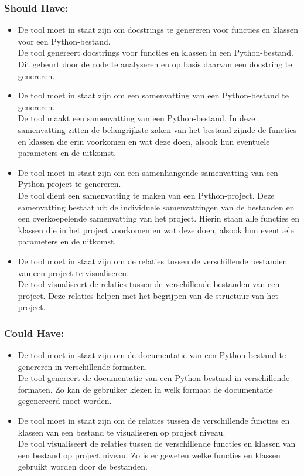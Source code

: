 \subsubsection{Should Have:}
\begin{itemize}
    \item De tool moet in staat zijn om docstrings te genereren voor functies en klassen voor een Python-bestand.\\
    De tool genereert docstrings voor functies en klassen in een Python-bestand. Dit gebeurt door de code te analyseren en op basis daarvan een docstring te genereren.
    \item De tool moet in staat zijn om een samenvatting van een Python-bestand te genereren.\\
    De tool maakt een samenvatting van een Python-bestand. In deze samenvatting zitten de belangrijkste zaken van het bestand zijnde de functies en klassen die erin voorkomen en wat deze doen, alsook hun eventuele parameters en de uitkomst.
    \item De tool moet in staat zijn om een samenhangende samenvatting van een Python-project te genereren.\\
    De tool dient een samenvatting te maken van een Python-project. Deze samenvatting bestaat uit de individuele samenvattingen van de bestanden en een overkoepelende samenvatting van het project.
    Hierin staan alle functies en klassen die in het project voorkomen en wat deze doen, alsook hun eventuele parameters en de uitkomst.
    \item De tool moet in staat zijn om de relaties tussen de verschillende bestanden van een project te visualiseren.\\
    De tool visualiseert de relaties tussen de verschillende bestanden van een project. Deze relaties helpen met het begrijpen van de structuur van het project.
\end{itemize}

\subsubsection{Could Have:}
\begin{itemize}
    \item De tool moet in staat zijn om de documentatie van een Python-bestand te genereren in verschillende formaten.\\
    De tool genereert de documentatie van een Python-bestand in verschillende formaten. Zo kan de gebruiker kiezen in welk formaat de documentatie gegenereerd moet worden.
    \item De tool moet in staat zijn om de relaties tussen de verschillende functies en klassen van een bestand te visualiseren op project niveau.\\
    De tool visualiseert de relaties tussen de verschillende functies en klassen van een bestand op project niveau. Zo is er geweten welke functies en klassen gebruikt worden door de bestanden.
\end{itemize}


